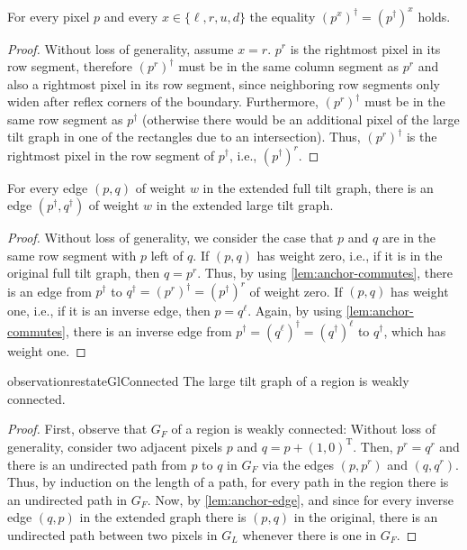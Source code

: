 \documentclass[a4paper,UKenglish,cleveref,thm-restate]{lipics-v2021}
\newcommand{\Tpose}{\ensuremath{\mathrm{T}}}
\begin{document}
\begin{lemma}
    \label{lem:anchor-commutes}
    For every pixel $p$ and every $x \in \{\ell, r, u, d\}$ the equality
    \((p^x)^\dagger = (p^\dagger)^x\) holds.
\end{lemma}
\begin{proof}
    Without loss of generality, assume $x=r$. $p^r$ is the rightmost pixel in its
    row segment, therefore $(p^r)^\dagger$ must be in the same column segment as
    $p^r$ and also a rightmost pixel in its row segment, since neighboring row
    segments only widen after reflex corners of the boundary. Furthermore,
    $(p^r)^\dagger$ must be in the same row segment as $p^\dagger$ (otherwise there
    would be an additional pixel of the large tilt graph in one of the rectangles
    due to an intersection). Thus, $(p^r)^\dagger$ is the rightmost pixel in the row
    segment of $p^\dagger$, i.e., $(p^\dagger)^r$.
\end{proof}

\begin{lemma}
    \label{lem:anchor-edge}
    For every edge $(p,q)$ of weight $w$ in the extended full tilt graph, there is
    an edge $(p^\dagger,q^\dagger)$ of weight $w$ in the extended large tilt graph.
\end{lemma}
\begin{proof}
    Without loss of generality, we consider the case that $p$ and $q$ are in the
    same row segment with $p$ left of $q$. If $(p,q)$ has weight zero, i.e., if it
    is in the original full tilt graph, then $q=p^r$. Thus, by using
    \cref{lem:anchor-commutes}, there is an edge from $p^\dagger$ to \(q^\dagger =
    (p^r)^\dagger = (p^\dagger)^r\) of weight zero. If $(p,q)$ has weight one, i.e.,
    if it is an inverse edge, then $p=q^\ell$. Again, by using
    \cref{lem:anchor-commutes}, there is an inverse edge from \(p^\dagger =
    (q^\ell)^\dagger = (q^\dagger)^\ell\) to $q^\dagger$, which has weight one.
\end{proof}

\begin{restatable}{observation}{restateGlConnected}\label{gl_connected}
The large tilt graph of a region is weakly connected.
\end{restatable}
\begin{proof}
    First, observe that $G_F$ of a region is weakly connected: Without loss of
    generality, consider two adjacent pixels $p$ and \(q=p + (1,0)^\Tpose\). Then,
    $p^r=q^r$ and there is an undirected path from $p$ to $q$ in $G_F$ via the edges
    $(p,p^r)$ and $(q,q^r)$. Thus, by induction on the length of a path, for every
    path in the region there is an undirected path in $G_F$. Now,
    by \cref{lem:anchor-edge}, and since for every inverse edge $(q,p)$ in the extended
    graph there is $(p,q)$ in the original, there is an undirected path between two
    pixels in $G_L$ whenever there is one in $G_F$.
\end{proof}
\end{document}
